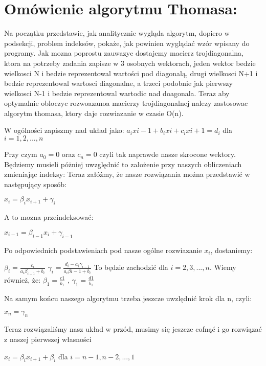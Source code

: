 \documentclass[12pt]{article}
\begin{document}
\section{Omówienie algorytmu Thomasa:}
Na początku przedstawie, jak analitycznie wygląda algorytm, dopiero w podsekcji, problem indeksów, pokaże, jak powinien wyglądać wzór wpisany do programy.\newline
Jak mozna poprostu zauwazyc dostajemy macierz trojdiagonalna, ktora na potrzeby zadania zapisze w 3 osobnych wektorach, jeden wektor bedzie wielkosci N i bedzie reprezentowal wartości pod diagonalą, drugi wielkosci N+1 i bedzie reprezentowal wartosci diagonalne, a trzeci podobnie jak pierwszy wielkosci N-1 i bedzie reprezentowal wartodic nad doagonala. Teraz aby optymalnie obloczyc rozwoazanoa macierzy trojdiagonalnej nalezy zastosowac algorytm thomasa, ktory daje rozwiazanie w czasie O(n).
\begin{center}
W ogólności zapiszmy nad układ jako:
$a_{i}x{i-1} + b_{i}x{i} + c_{i}x{i+1} = d_{i}$ dla $i = 1,2,...,n$
\end{center}
Przy czym $a_{0} = 0$ oraz $c_{n} = 0$ czyli tak naprawde nasze skrocone wektory. Będziemy musieli póżniej uwzględnić to założenie przy naszych obliczeniach zmieniając indeksy:
Teraz załóżmy, że nasze rozwiązania można przedstawić w następujący sposób:
\begin{center}
$x_{i} = \beta_{i}x_{i+1} + \gamma_{i}$
\end{center}
A to mozna przeindeksować:
\begin{center}
$x_{i-1} = \beta_{i-1}x_{i} + \gamma_{i-1}$
\end{center}
Po odpowiednich podstawieniach pod nasze ogólne rozwiazanie $x_{i}$, dostaniemy:
\begin{center}
$\beta_{i} = \frac{c_{i}}{a_{i}\beta_{i-1}+b_{i}}$\newline\newline
$\gamma_{i} = \frac{d_{i}-a_{i}\gamma_{i-1}}{a_{i}\beta{i-1}+b_{i}}$\newline\newline
To będzie zachodzić dla $i=2,3,...,n$.
Wiemy również, że:\newline\newline
$\beta_{1} = \frac{c{1}}{b_{1}}$ ,
$\gamma_{1} = \frac{d{1}}{b_{1}}$
\end{center}
Na samym końcu naszego algorytmu trzeba jeszcze uwzlędnić krok dla n, czyli:
\begin{center}
$x_{n} = \gamma_{n}$
\end{center}
Teraz rozwiązaliśmy nasz układ w przód, musimy się jeszcze cofnąć i go rozwiązać z naszej pierwszej własności 
\begin{center}
$x_{i} = \beta_{i}x_{i+1}+\beta_{i}$ dla $i = n-1, n-2,...,1$
\end{center}
\end{document}
